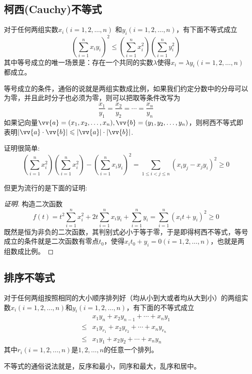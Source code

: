\subsection{柯西(Cauchy)不等式}

\begin{theorem}[柯西不等式]
  对于任何两组实数$x_i(i=1,2,\ldots,n)$ 和$y_i(i=1,2,\ldots,n)$，有下面不等式成立
  \begin{equation}
    \label{eq:cauchy-inequation}
    \left( \sum_{i=1}^nx_iy_i \right)^{2} \leqslant \left( \sum_{i=1}^{n}x_i^2 \right) \left( \sum_{i=1}^ny_i^{2} \right)
  \end{equation}
  其中等号成立的唯一场景是：存在一个共同的实数$\lambda$使得$x_i=\lambda y_{i}(i=1,2,\ldots,n)$都成立。
\end{theorem}
等号成立的条件，通俗的说就是两组实数成比例，如果我们约定分数中的分母可以为零，并且此时分子也必须为零，则可以把取等条件改写为
\begin{equation*}
  \frac{x_1}{y_1} = \frac{x_2}{y_2} = \cdots = \frac{x_n}{y_n}
\end{equation*}
如果记向量$\vv{a}=(x_1,x_2,\ldots,x_n), \vv{b}=(y_1,y_2,\ldots,y_n)$，则柯西不等式即表明$|\vv{a} \cdot \vv{b}| \leqslant |\vv{a}| \cdot |\vv{b}|$.

证明很简单:
\begin{equation*}
  \left( \sum_{i=1}^nx_i^2 \right) \left( \sum_{i=1}^nx_i^2 \right) - \left( \sum_{i=1}^nx_iy_i \right)^2 = \sum_{1 \leqslant i < j \leqslant n}(x_iy_j-x_jy_i)^2 \geqslant 0
\end{equation*}

但更为流行的是下面的证明:

\begin{proof}[证明]
  构造二次函数
  \begin{equation*}
  f(t)=t^2\sum_{i=1}^nx_i^2+2t\sum_{i=1}^nx_iy_i+\sum_{i=1}^ny_i=\sum_{i=1}^n(x_it+y_i)^2 \geqslant 0
  \end{equation*}
 既然是恒为非负的二次函数，其判别式必小于等于零，于是即得柯西不等式，等号成立的条件就是二次函数有零点$t_0$，使得$x_it_0+y_i=0(i=1,2,\ldots,n)$，也就是两组数成比例。
\end{proof}

\subsection{排序不等式}

\begin{theorem}[排序不等式]
  对于任何两组按照相同的大小顺序排列好（均从小到大或者均从大到小）的两组实数$x_i(i=1,2,\ldots,n)$和$y_i(i=1,2,\ldots,n)$，有下面的不等式成立
  \begin{eqnarray}
    \label{eq:rearrangement inequality}
    & x_1y_n+x_2y_{n-1}+\cdots+x_ny_1 \nonumber \\
    \leqslant & x_1y_{r_1}+x_2y_{r_2}+\cdots+x_ny_{r_n} \nonumber \\
    \leqslant & x_1y_1+x_2y_2+\cdots+x_ny_n
  \end{eqnarray}
  其中$r_i(i=1,2,\ldots,n)$是$1,2,\ldots,n$的任意一个排列。
\end{theorem}
不等式的通俗说法就是，反序和最小，同序和最大，乱序和居中。

